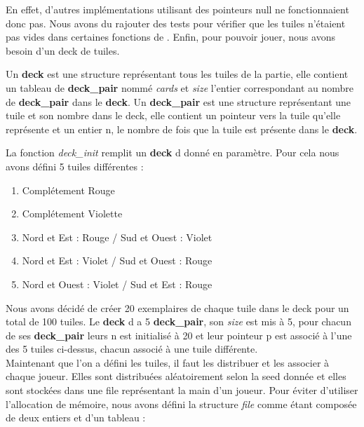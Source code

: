 \documentclass[a4paper]{article}
\begin{document}
En effet, d'autres implémentations utilisant des pointeurs null ne fonctionnaient donc pas. Nous avons du rajouter des tests pour vérifier que les tuiles n'étaient pas vides dans certaines fonctions de . Enfin, pour pouvoir jouer, nous avons besoin d'un deck de tuiles. 

Un \textbf{deck} est une structure représentant tous les tuiles de la partie, elle contient un tableau de \textbf{deck\_pair} nommé \emph{cards} et \emph{size} l'entier correspondant au nombre de \textbf{deck\_pair} dans le \textbf{deck}.
Un \textbf{deck\_pair} est une structure représentant une tuile et son nombre dans le deck, elle contient un pointeur vers la tuile qu'elle représente et un entier n, le nombre de fois que la tuile est présente dans le \textbf{deck}.

La fonction \emph{deck\_init} remplit un \textbf{deck} d donné en paramètre.
Pour cela nous avons défini 5 tuiles différentes : \\
\begin{enumerate}
        \item Complétement Rouge

        \item Complétement Violette
    
        \item Nord et Est : Rouge / Sud et Ouest : Violet
        
        \item Nord et Est : Violet / Sud et Ouest : Rouge
        
        \item Nord et Ouest : Violet / Sud et Est : Rouge \\
\end{enumerate}
Nous avons décidé de créer 20 exemplaires de chaque tuile dans le deck pour un total de 100 tuiles. Le \textbf{deck} d a 5 \textbf{deck\_pair}, son \emph{size} est mis à 5, pour chacun de ses \textbf{deck\_pair} leurs n est initialisé à 20 et leur pointeur p est associé à l'une des 5 tuiles ci-dessus, chacun associé à une tuile différente. \\
Maintenant que l'on a défini les tuiles, il faut les distribuer et les associer à chaque joueur. Elles sont distribuées aléatoirement selon la seed donnée et elles sont stockées dans une file représentant la main d'un joueur. Pour éviter d'utiliser l'allocation de mémoire, nous avons défini la structure \emph{file} comme étant composée de deux entiers et d'un tableau : \\
\end{document}
